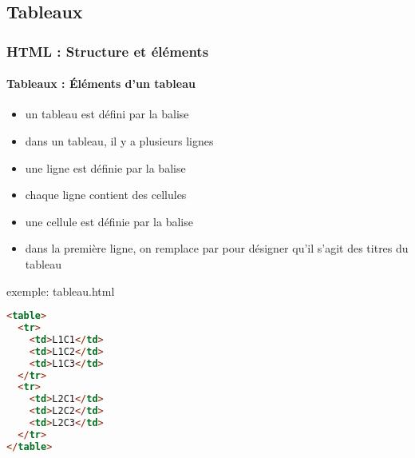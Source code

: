 \documentclass[xcolor=table]{beamer}
\begin{document}
\subsection{Tableaux}

\begin{frame}[fragile]
\frametitle{HTML : Structure et éléments}
\framesubtitle{Tableaux : Éléments d'un tableau}

\begin{minipage}{0.60\textwidth} 
	\begin{itemize}
		\item un tableau est défini par la balise 
		\item dans un tableau, il y a plusieurs lignes
		\item une ligne est définie par la balise 
		\item chaque ligne contient des cellules
		\item une cellule est définie par la balise 
		\item dans la première ligne, on remplace  par  pour désigner qu'il s'agit des titres du tableau
	\end{itemize}
\end{minipage}
%
\begin{minipage}{0.39\textwidth}
\begin{exampleblock}{exemple: tableau.html}
\lstset{escapeinside=**}
\scriptsize\bfseries
\begin{lstlisting}[language={html}]
<table>
  <tr>
    <td>L1C1</td>
    <td>L1C2</td>
    <td>L1C3</td>
  </tr>
  <tr>
    <td>L2C1</td>
    <td>L2C2</td>
    <td>L2C3</td>
  </tr>
</table>
\end{lstlisting}
\end{exampleblock}
\end{minipage}

\end{frame}
\end{document}
